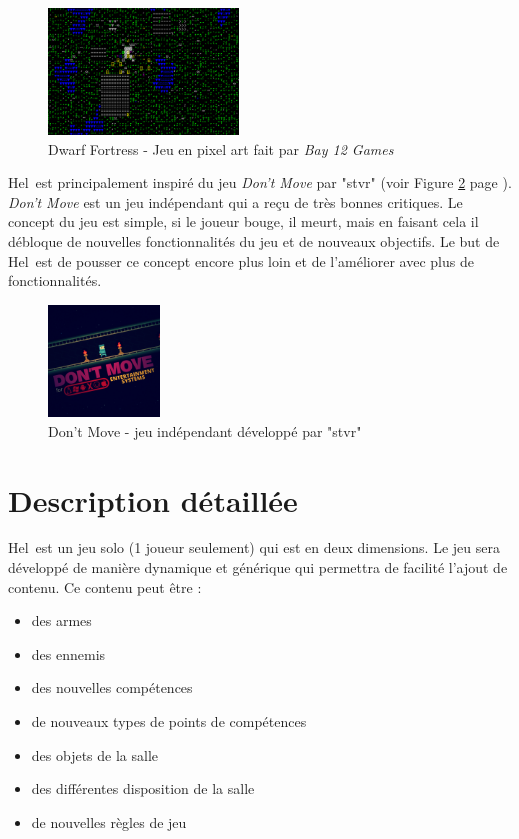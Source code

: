 \documentclass[11pt, a4paper, oneside]{report}
\newcommand{\projectTitle}{Hel}
\begin{document}
\begin{figure}[h]
	\begin{center}
	\includegraphics[width=0.45\textwidth]{df}
	\caption{Dwarf Fortress - Jeu en pixel art fait par \textit{Bay 12 Games}}
	\label{fig:df}
	\end{center}
\end{figure}

\projectTitle~est principalement inspiré du jeu \emph{Don't Move} par "stvr" (voir Figure \ref{fig:dontmove} page \pageref{fig:dontmove}). \emph{Don't Move} est un jeu indépendant qui a reçu de très bonnes critiques. Le concept du jeu est simple, si le joueur bouge, il meurt, mais en faisant cela il débloque de nouvelles fonctionnalités du jeu et de nouveaux objectifs. Le but de \projectTitle~est de pousser ce concept encore plus loin et de l'améliorer avec plus de fonctionnalités.

\begin{figure}[h]
	\begin{center}
	\includegraphics[width=0.265\textwidth]{dontmove}
	\caption{Don't Move - jeu indépendant développé par "stvr"}
	\label{fig:dontmove}
	\end{center}
\end{figure}

\section{Description détaillée}
\projectTitle~est un jeu solo (1 joueur seulement) qui est en deux dimensions. Le jeu sera développé de manière dynamique et générique qui permettra de facilité l'ajout de contenu. Ce contenu peut être :
\begin{multicols}{2}
\begin{itemize}
	\item des armes
	\item des ennemis
	\item des nouvelles compétences
	\item de nouveaux types de points de compétences
	\item des objets de la salle
	\item des différentes disposition de la salle
	\item de nouvelles règles de jeu
\end{itemize}
\end{multicols}
\end{document}
